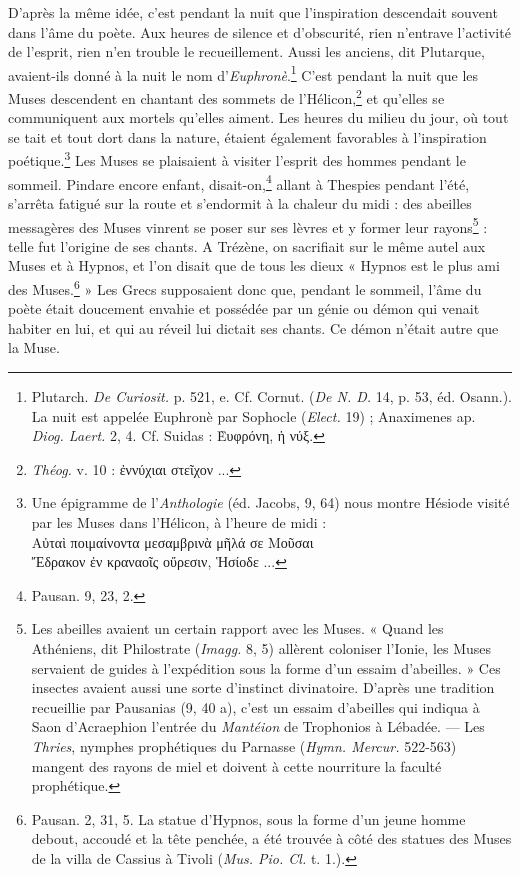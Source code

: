\documentclass[a4paper, 11pt, oneside, polutonikogreek, french]{article}
\begin{document}
D'après la même idée, c'est pendant la nuit que l'inspiration descendait souvent dans l'âme du poète. Aux heures de silence et d'obscurité, rien n'entrave l'activité de l'esprit, rien n'en trouble le recueillement. Aussi les anciens, dit Plutarque, avaient-ils donné à la nuit le nom d'\emph{Euphronè}.\footnote{Plutarch. \emph{De Curiosit.} p. 521, e. Cf. Cornut. (\emph{De N. D.} 14, p. 53, éd. Osann.). La nuit est appelée Euphronè par Sophocle (\emph{Elect.} 19) ; Anaximenes ap. \emph{Diog. Laert.} 2, 4. Cf. Suidas : Ὲυφρόνη, ἡ νύξ.} C'est pendant la nuit que les Muses descendent en chantant des sommets de l'Hélicon,\footnote{\emph{Théog.} v. 10 : ἐννύχιαι στεῖχον ...} et qu'elles se communiquent aux mortels qu'elles aiment. Les heures du milieu du jour, où tout se tait et tout dort dans la nature, étaient également favorables à l'inspiration poétique.\footnote{Une épigramme de l'\emph{Anthologie} (éd. Jacobs, 9, 64) nous montre Hésiode visité par les Muses dans l'Hélicon, à l'heure de midi :\\\hspace*{5mm}Αὐταὶ ποιμαίνοντα μεσαμβρινὰ μῆλά σε Μοῦσαι\\\hspace*{5mm}Ἔδρακον ἐν κραναοῖς οὔρεσιν, Ἡσίοδε ...} Les Muses se plaisaient à visiter l'esprit des hommes pendant le sommeil. Pindare encore enfant, disait-on,\footnote{Pausan. 9, 23, 2.} allant à Thespies pendant l'été, s'arrêta fatigué sur la route et s'endormit à la chaleur du midi : des abeilles messagères des Muses vinrent se poser sur ses lèvres et y former leur rayons\footnote{Les abeilles avaient un certain rapport avec les Muses. « Quand les Athéniens, dit Philostrate (\emph{Imagg.} 8, 5) allèrent coloniser l'Ionie, les Muses servaient de guides à l'expédition sous la forme d'un essaim d'abeilles. » Ces insectes avaient aussi une sorte d'instinct divinatoire. D'après une tradition recueillie par Pausanias (9, 40 a), c'est un essaim d'abeilles qui indiqua à Saon d'Acraephion l'entrée du \emph{Mantéion} de Trophonios à Lébadée. --- Les \emph{Thries}, nymphes prophétiques du Parnasse (\emph{Hymn. Mercur.} 522-563) mangent des rayons de miel et doivent à cette nourriture la faculté prophétique.} : telle fut l'origine de ses chants. A Trézène, on sacrifiait sur le même autel aux Muses et à Hypnos, et l'on disait que de tous les dieux « Hypnos est le plus ami des Muses.\footnote{Pausan. 2, 31, 5. La statue d'Hypnos, sous la forme d'un jeune homme debout, accoudé et la tête penchée, a été trouvée à côté des statues des Muses de la villa de Cassius à Tivoli (\emph{Mus. Pio. Cl.} t. 1.).} » Les Grecs supposaient donc que, pendant le sommeil, l'âme du poète était doucement envahie et possédée par un génie ou démon qui venait habiter en lui, et qui au réveil lui dictait ses chants. Ce démon n'était autre que la Muse.
\end{document}
